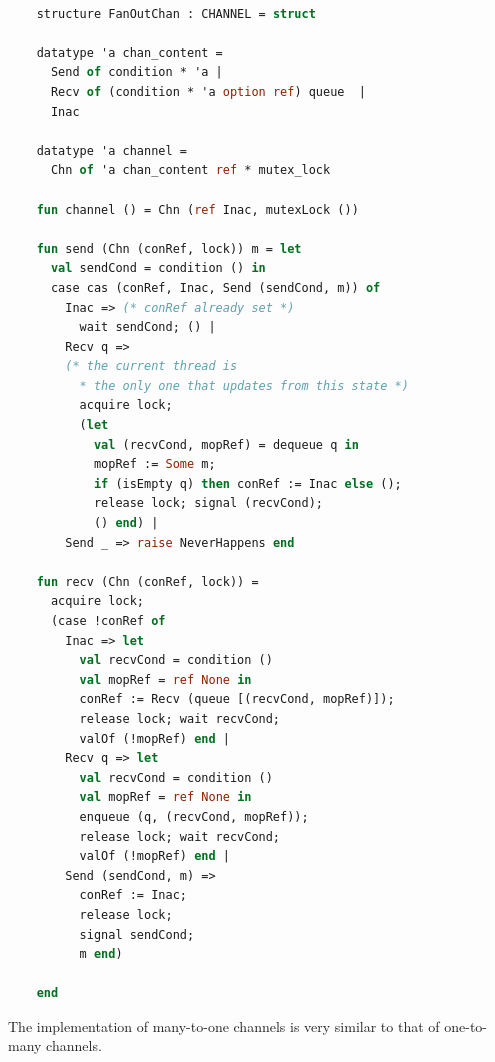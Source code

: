 \documentclass{article}
\begin{document}
  \begin{lstlisting}[language=ML, escapechar=\%]

    structure FanOutChan : CHANNEL = struct

    datatype 'a chan_content =
      Send of condition * 'a |
      Recv of (condition * 'a option ref) queue  |
      Inac

    datatype 'a channel =
      Chn of 'a chan_content ref * mutex_lock

    fun channel () = Chn (ref Inac, mutexLock ())

    fun send (Chn (conRef, lock)) m = let
      val sendCond = condition () in
      case cas (conRef, Inac, Send (sendCond, m)) of
        Inac => (* conRef already set *)
          wait sendCond; () |
        Recv q => 
        (* the current thread is
          * the only one that updates from this state *)
          acquire lock;
          (let
            val (recvCond, mopRef) = dequeue q in
            mopRef := Some m; 
            if (isEmpty q) then conRef := Inac else (); 
            release lock; signal (recvCond);
            () end) |
        Send _ => raise NeverHappens end

    fun recv (Chn (conRef, lock)) =
      acquire lock;
      (case !conRef of
        Inac => let
          val recvCond = condition ()
          val mopRef = ref None in
          conRef := Recv (queue [(recvCond, mopRef)]);
          release lock; wait recvCond;
          valOf (!mopRef) end |
        Recv q => let
          val recvCond = condition () 
          val mopRef = ref None in
          enqueue (q, (recvCond, mopRef));
          release lock; wait recvCond;
          valOf (!mopRef) end |
        Send (sendCond, m) =>
          conRef := Inac;
          release lock;
          signal sendCond;
          m end) 

    end 
  \end{lstlisting}

The implementation of many-to-one channels is very similar to that of one-to-many channels.
\end{document}
